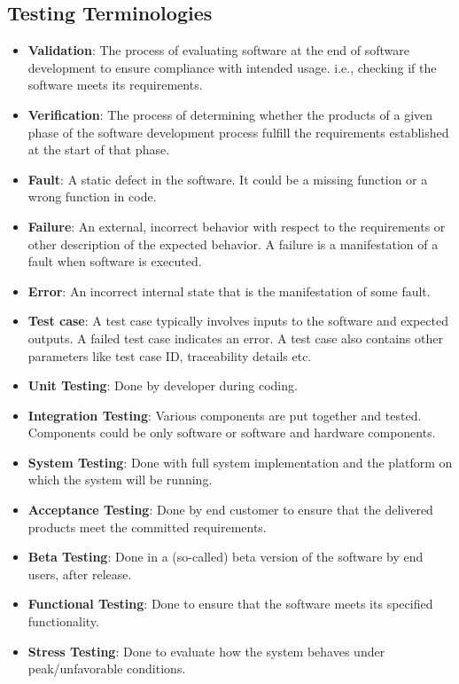 \documentclass[a4paper]{article}
\begin{document}
\subsection{Testing Terminologies}
\begin{itemize}
    \item \textbf{Validation}: The process of evaluating software at the end of software development to ensure compliance with intended usage. i.e., checking if the software meets its requirements.
    \item \textbf{Verification}: The process of determining whether the products of a given phase of the software development process fulfill the requirements established at the start of that phase.
    \item \textbf{Fault}: A static defect in the software. It could be a missing function or a wrong function in code.
    \item \textbf{Failure}: An external, incorrect behavior with respect to the requirements or other description of the expected behavior. A failure is a manifestation of a fault when software is executed.
    \item \textbf{Error}: An incorrect internal state that is the manifestation of some fault.
    \item \textbf{Test case}: A test case typically involves inputs to the software and expected outputs. A failed test case indicates an error. A test case also contains other parameters like test case ID, traceability details etc.
    \item \textbf{Unit Testing}: Done by developer during coding.
    \item \textbf{Integration Testing}: Various components are put together and tested. Components could be only software or software and hardware components.
    \item \textbf{System Testing}: Done with full system implementation and the platform on which the system will be running.
    \item \textbf{Acceptance Testing}: Done by end customer to ensure that the delivered products meet the committed requirements.
    \item \textbf{Beta Testing}: Done in a (so-called) beta version of the software by end users, after release.
    \item \textbf{Functional Testing}: Done to ensure that the software meets its specified functionality.
    \item \textbf{Stress Testing}: Done to evaluate how the system behaves under peak/unfavorable conditions.

\end{itemize}
\end{document}
